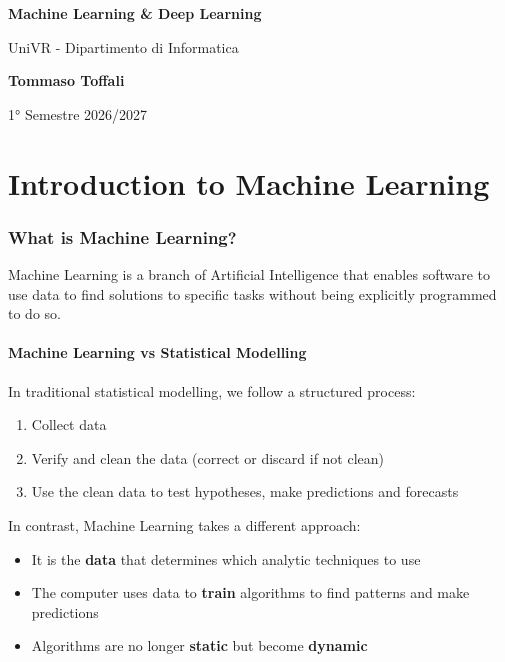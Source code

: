 \documentclass[a4paper]{article}
\theoremstyle{definition}
\begin{document}
\begin{titlepage}
	\begin{center}
		\vspace*{1cm}

		\Huge
		\textbf{Machine Learning \& Deep Learning}

		\vspace{0.5cm}
		\LARGE
		UniVR - Dipartimento di Informatica

		\vspace{1.5cm}

		\textbf{Tommaso Toffali}

		\vfill


		\vspace{0.8cm}


		1° Semestre 2026/2027
    \end{center}
\end{titlepage}

\tableofcontents
\pagebreak
\part{Introduction to Machine Learning}
\section{What is Machine Learning?}
Machine Learning is a branch of Artificial Intelligence that enables
software to use data to find solutions to specific tasks without being explicitly
programmed to do so.
\subsection{Machine Learning vs Statistical Modelling}
In traditional statistical modelling, we follow a structured process:
\begin{enumerate}
    \item Collect data 
    \item Verify and clean the data (correct or discard if not clean)
    \item Use the clean data to test hypotheses, make predictions and forecasts
\end{enumerate}
In contrast, Machine Learning takes a different approach:
\begin{itemize}
    \item It is the \textbf{data} that determines which analytic techniques to use 
    \item The computer uses data to \textbf{train} algorithms to find patterns and make predictions 
    \item Algorithms are no longer \textbf{static} but become \textbf{dynamic}
\end{itemize}
\end{document}
